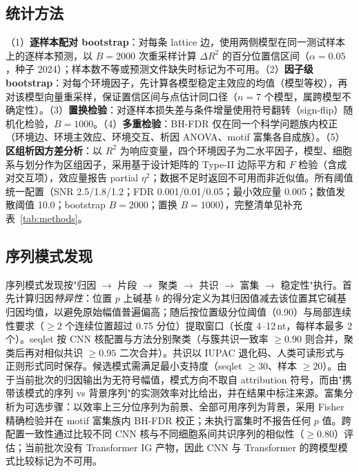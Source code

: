 \subsection{统计方法}

（1）\textbf{逐样本配对 bootstrap}：对每条 lattice 边，使用两侧模型在同一测试样本上的逐样本预测，以 $B=2000$ 次重采样计算 $\Delta R^{2}$ 的百分位置信区间（$\alpha=0.05$，种子 2024）；样本数不等或预测文件缺失时标记为不可用。（2）\textbf{因子级 bootstrap}：对每个环境因子，先计算各模型稳定主效应的均值（模型等权），再对该模型向量重采样，保证置信区间与点估计同口径（$n=7$ 个模型，属跨模型不确定性）。（3）\textbf{置换检验}：对逐样本损失差与条件增量使用符号翻转（sign-flip）随机化检验，$B=1000$。（4）\textbf{多重检验}：BH-FDR 仅在同一个科学问题族内校正（环境边、环境主效应、环境交互、析因 ANOVA、motif 富集各自成族）。（5）\textbf{区组析因方差分析}：以 $R^{2}$ 为响应变量，四个环境因子为二水平因子，模型、细胞系与划分作为区组因子，采用基于设计矩阵的 Type-II 边际平方和 $F$ 检验（含成对交互项），效应量报告 partial $\eta^{2}$；数据不足时返回不可用而非近似值。所有阈值统一配置（SNR 2.5/1.8/1.2；FDR 0.001/0.01/0.05；最小效应量 0.005；数值发散阈值 10.0；bootstrap $B=2000$；置换 $B=1000$），完整清单见补充表~\ref{tab:methods}。

\subsection{序列模式发现}

序列模式发现按"归因 $\rightarrow$ 片段 $\rightarrow$ 聚类 $\rightarrow$ 共识 $\rightarrow$ 富集 $\rightarrow$ 稳定性"执行。首先计算归因\emph{特异性}：位置 $p$ 上碱基 $b$ 的得分定义为其归因值减去该位置其它碱基归因均值，以避免原始幅值普遍偏高；随后按位置级分位阈值（0.90）与局部连续性要求（$\ge 2$ 个连续位置超过 0.75 分位）提取窗口（长度 4--12\,nt，每样本最多 2 个）。seqlet 按 CNN 核配置与方法分别聚类（与簇共识一致率 $\ge0.90$ 则合并，聚类后再对相似共识 $\ge0.95$ 二次合并）。共识以 IUPAC 退化码、人类可读形式与正则形式同时保存。候选模式需满足最小支持度（seqlet $\ge30$、样本 $\ge20$）。由于当前批次的归因输出为无符号幅值，模式方向不取自 attribution 符号，而由"携带该模式的序列 vs 背景序列"的实测效率对比给出，并在结果中标注来源。富集分析为可选步骤：以效率上三分位序列为前景、全部可用序列为背景，采用 Fisher 精确检验并在 motif 富集族内 BH-FDR 校正；未执行富集时不报告任何 $p$ 值。跨配置一致性通过比较不同 CNN 核与不同细胞系间共识序列的相似性（$\ge0.80$）评估；当前批次没有 Transformer IG 产物，因此 CNN 与 Transformer 的跨模型模式比较标记为不可用。


